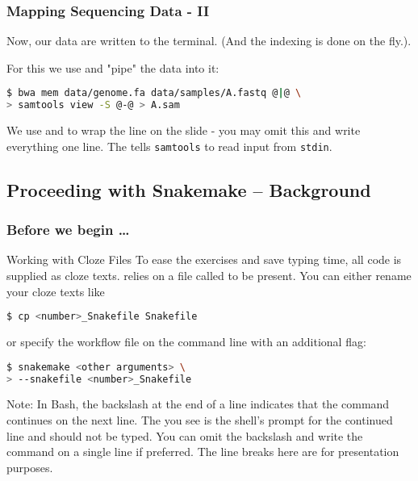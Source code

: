\begin{frame}[fragile]
	\frametitle{Mapping Sequencing Data - II}
	\begin{task}
		Now, our data are written to the terminal. (And the indexing is done on the fly.).\newline
	\end{task}
	\pause
	
	For this we use  and "pipe" the data into it:
	\begin{lstlisting}[language=Bash, style=Shell]
$ bwa mem data/genome.fa data/samples/A.fastq @|@ \
> samtools view -S @-@ > A.sam
	\end{lstlisting}
	\begin{docs}
	   We use \altverb{\\} and \altverb{>} to wrap the line on the slide - you may omit this and write everything one line.\newline
		The \altverb{-} tells \texttt{samtools} to read input from \texttt{stdin}.
	\end{docs}
\end{frame}

\subsection{Proceeding with Snakemake -- Background}

\begin{frame}[fragile]
	\frametitle{Before we begin \ldots}
	\begin{exampleblock}{Working with Cloze Files}
		To ease the exercises and save typing time, all code is supplied as cloze texts.\linebreak
		\Snakemake{} relies on a file called \altverb{Snakefile} to be present. You can either rename your cloze texts like
		\begin{lstlisting}[language=Bash, style=Shell]
$ cp <number>_Snakefile Snakefile
		\end{lstlisting}
		or specify the workflow file on the command line with an additional flag:
		\begin{lstlisting}[language=Bash, style=Shell]
$ snakemake <other arguments> \
> --snakefile <number>_Snakefile
		\end{lstlisting}
		Note: In Bash, the backslash \altverb{\\} at the end of a line indicates that the command continues on the next line. The \altverb{>} you see is the shell's prompt for the continued line and should not be typed. You can omit the backslash and write the command on a single line if preferred. The line breaks here are for presentation purposes.
	\end{exampleblock}
\end{frame}

